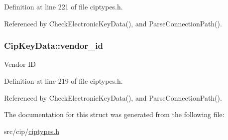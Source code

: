 \-Definition at line 221 of file ciptypes.\-h.



\-Referenced by \-Check\-Electronic\-Key\-Data(), and \-Parse\-Connection\-Path().

\hypertarget{structCipKeyData_aa97bd52f097964a77cb343e068b21d57}{
\subsubsection[{vendor\-\_\-id}]{ {\bf \-Cip\-Key\-Data\-::vendor\-\_\-id}}}\label{df/d55/structCipKeyData_aa97bd52f097964a77cb343e068b21d57}
\-Vendor \-I\-D 

\-Definition at line 219 of file ciptypes.\-h.



\-Referenced by \-Check\-Electronic\-Key\-Data(), and \-Parse\-Connection\-Path().



\-The documentation for this struct was generated from the following file\-:\begin{DoxyCompactItemize}
\item 
src/cip/\hyperlink{ciptypes_8h}{ciptypes.\-h}\end{DoxyCompactItemize}
